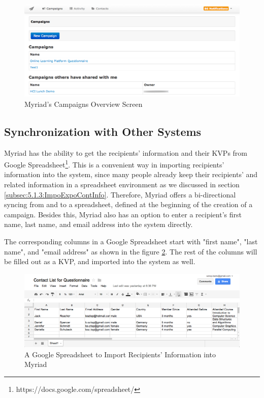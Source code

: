 \begin{figure}[htbp]
	\centering
	\includegraphics[width=1.00\textwidth]{imgs/CampaignsOverviewScreen.png}
	\caption[Myriad's Campaigns Overview Screen]{Myriad's Campaigns Overview Screen}
	\label{fig:CampaignsOverviewScreen}
\end{figure}

\subsection{Synchronization with Other Systems}
\label{subsec:5.2.2:SyncOtheSyst}

Myriad has the ability to get the recipients' information and their \ac{KVP}s from Google Spreadsheet\footnote{https://docs.google.com/spreadsheet/}. This is a convenient way in importing recipients' information into the system, since many people already keep their recipients' and related information in a spreadsheet environment as we discussed in section \ref{subsec:5.1.3:ImpoExpoContInfo}. Therefore, Myriad offers a bi-directional syncing from and to a spreadsheet, defined at the beginning of the creation of a campaign. Besides this, Myriad also has an option to enter a recipient's first name, last name, and email address into the system directly.
\vspace{1cm}

The corresponding columns in a Google Spreadsheet start with "first name", "last name", and "email address" as shown in the figure \ref{fig:GoogleSpreadsheet}. The rest of the columns will be filled out as a \ac{KVP}, and imported into the system as well.

\begin{figure}[htbp]
	\centering
	\includegraphics[width=1.00\textwidth]{imgs/GoogleSpreadsheet.png}
	\caption[A Google Spreadsheet to Import Recipients' Information into Myriad]{A Google Spreadsheet to Import Recipients' Information into Myriad}
	\label{fig:GoogleSpreadsheet}
\end{figure}

